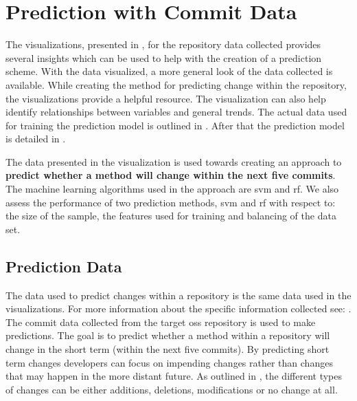 \chapter{Prediction with Commit Data}
\label{chap:prediction}


The visualizations, presented in , for the repository data collected provides several insights which can be used to help with the creation of a prediction scheme. With the data visualized, a more general look of the data collected is available. While creating the method for predicting change within the repository, the visualizations provide a helpful resource. The visualization can also help identify relationships between variables and general trends. The actual data used for training the prediction model is outlined in . After that the prediction model is detailed in . %

The data presented in the visualization is used towards creating an approach to \textbf{predict whether a method will change within the next five commits}. The machine learning algorithms used in the approach are \gls{svm} and \gls{rf}. We also assess the performance of two prediction methods, \gls{svm} and \gls{rf} with respect to: the size of the sample, the features used for training and balancing of the data set.

\section{Prediction Data}
\label{sec:prediction_data}

The data used to predict changes within a repository is the same data used in the visualizations. For more information about the specific information collected see: . The commit data collected from the target \gls{oss} repository is used to make predictions. The goal is to predict whether a method within a repository will change in the short term (within the next five commits). By predicting short term changes developers can focus on impending changes rather than changes that may happen in the more distant future. As outlined in , the different types of changes can be either additions, deletions, modifications or no change at all.

